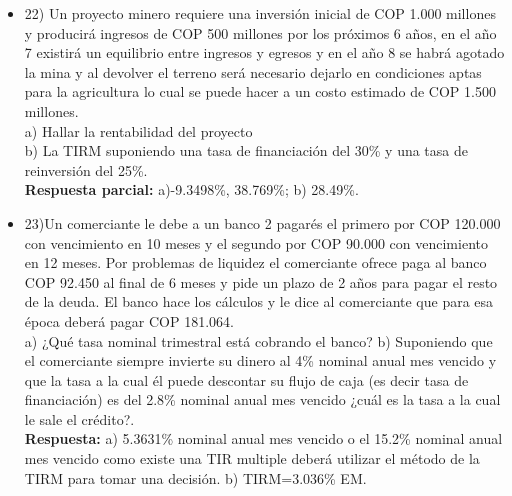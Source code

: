 \begin{itemize}
 \item 22)	Un proyecto minero requiere una inversión inicial de COP 1.000 millones y producirá ingresos de COP 500 millones por los próximos 6 años, en el año 7 existirá un equilibrio entre ingresos y egresos y en el año 8 se habrá agotado la mina y al devolver el terreno será necesario dejarlo en condiciones aptas para la agricultura lo cual se puede hacer a un costo estimado de COP 1.500 millones.\\
       a) Hallar la rentabilidad del proyecto\\
       b) La TIRM suponiendo una tasa de financiación del 30\% y una tasa de reinversión del 25\%.\\
       \textbf{Respuesta parcial:} a)-9.3498\%, 38.769\%; b) 28.49\%.
       \medskip

 \item 23)Un comerciante le debe a un banco 2 pagarés el primero por COP 120.000 con vencimiento en 10 meses y el segundo por COP 90.000 con vencimiento en 12 meses. Por problemas de liquidez el comerciante ofrece paga al banco COP 92.450 al final de 6 meses y pide un
       plazo de 2 años para pagar el resto de la deuda. El banco hace los cálculos y le dice al comerciante que para esa época deberá pagar COP 181.064.\\
       a) ¿Qué tasa nominal trimestral está cobrando el banco?
       b) Suponiendo que el comerciante siempre invierte su dinero al 4\% nominal anual mes vencido  y que la tasa a la cual él puede descontar su flujo de caja (es decir tasa de financiación) es del 2.8\% nominal anual mes vencido ¿cuál es la tasa a la cual le sale el crédito?.\\
       \textbf{Respuesta:} a) 5.3631\% nominal anual mes vencido  o el 15.2\% nominal anual mes vencido  como existe una TIR multiple deberá utilizar el método de la TIRM para tomar una decisión. b) TIRM=3.036\% EM.
       \medskip


\end{itemize}
